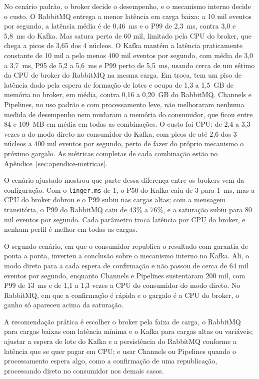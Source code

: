 \documentclass[12pt]{article}
\begin{document}
No cenário padrão, o broker decide o desempenho, e o mecanismo interno decide o custo.
O RabbitMQ entrega a menor latência em carga baixa: a 10 mil eventos por segundo,
a latência média é de 0,46~ms e o P99 de 2,3~ms, contra 3,0 e 5,8~ms do Kafka. Mas
satura perto de 60 mil, limitado pela CPU do broker, que chega a picos de 3,65 dos
4 núcleos. O Kafka mantém a latência praticamente constante de 10 mil a pelo menos
400 mil eventos por segundo, com média de 3,0 a 3,7~ms, P95 de 5,2 a 5,6~ms e P99
perto de 5,5~ms, usando cerca de um sétimo da CPU de broker do RabbitMQ na mesma
carga. Em troca, tem um piso de latência dado pela espera de formação de lotes e
ocupa de 1,3 a 1,5~GB de memória no broker, em média, contra 0,16 a 0,20~GB do
RabbitMQ. Channels e Pipelines, no uso padrão e com processamento leve, não
melhoraram nenhuma medida de desempenho nem mudaram a memória do consumidor, que
ficou entre 84 e 109~MB em média em todas as combinações. O custo foi CPU: de 2,4 a
3,3 vezes a do modo direto no consumidor do Kafka, com picos de até 2,6 dos 3
núcleos a 400 mil eventos por segundo, perto de fazer do próprio mecanismo o
próximo gargalo. As métricas completas de cada combinação estão no
Apêndice~\ref{sec:apendice-metricas}.

O cenário ajustado mostrou que parte dessa diferença entre os brokers vem da
configuração. Com o \texttt{linger.ms} de 1, o P50 do Kafka caiu de 3 para 1~ms, mas a
CPU do broker dobrou e o P99 subiu nas cargas altas; com a mensagem transitória, o P99
do RabbitMQ caiu de 43\% a 76\%, e a saturação subiu para 80 mil eventos por segundo.
Cada parâmetro troca latência por CPU do broker, e nenhum perfil é melhor em todas as
cargas.

O segundo cenário, em que o consumidor republica o resultado com garantia de ponta a
ponta, inverteu a conclusão sobre o mecanismo interno no Kafka. Ali, o modo direto
para a cada espera de confirmação e não passou de cerca de 64 mil eventos por segundo,
enquanto Channels e Pipelines sustentaram 200 mil, com P99 de 13~ms e de 1,1 a 1,3
vezes a CPU do consumidor do modo direto. No RabbitMQ, em que a confirmação é rápida e o
gargalo é a CPU do broker, o ganho só apareceu acima da saturação.

A recomendação prática é escolher o broker pela faixa de carga, o RabbitMQ para
cargas baixas com latência mínima e o Kafka para cargas altas ou variáveis; ajustar a
espera de lote do Kafka e a persistência do RabbitMQ conforme a latência que se quer
pagar em CPU; e usar Channels ou Pipelines quando o processamento espera algo, como a
confirmação de uma republicação, processando direto no consumidor nos demais casos.
\end{document}
